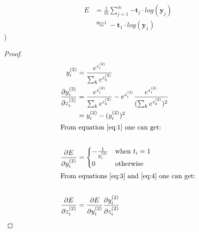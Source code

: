 \documentclass[letterpaper, 11pt]{article}
\begin{document}
\begin{align}
    E & = \frac{1}{m}\sum_{j=1}^{m}{-\textbf{t}_j\cdot log(\textbf{y}_j)} \nonumber \\
      & \stackrel{\text{m=1}}{=} -\textbf{t}_1\cdot log(\textbf{y}_1) \label{eq:1}
\end{align}
)
\begin{proof}
    \begin{align}
        y_i^{(2)}                                     & = \frac{e^{z_i^{(2)}}}{\sum_k{e^{z_k^{(2)}}}}                                                                         \\
        \frac{\partial y_i^{(2)}}{\partial z_i^{(2)}} & = \frac{e^{z_i^{(2)}}}{\sum_k{e^{z_k^{(2)}}}} - e^{z_i^{(2)}}\frac{e^{z_i^{(2)}}}{(\sum_k{e^{z_k^{(2)}}})^2}\nonumber \\
                                                      & = y_i^{(2)} - (y_i^{(2)})^2\label{eq:3}                                                                               \\
        \intertext{From equation \eqref{eq:1} one can get:}\nonumber                                                                                                          \\
        \frac{\partial E}{\partial y_i^{(2)}}         & =
        \begin{cases}
            -\frac{1}{y_i^{(2)}} & \text{when $t_i=1$} \\
            0                    & \text{otherwise}    \\
        \end{cases}\label{eq:4}                                                                                                                            \\
        \intertext{From equations \eqref{eq:3} and \eqref{eq:4} one can get:}\nonumber                                                                                        \\
        \frac{\partial E}{\partial z_i^{(2)}}         & =
        \frac{\partial E}{\partial y_i^{(2)}} \frac{\partial y_i^{(2)}}{\partial z_i^{(2)}} \nonumber                                                                         \\

\end{align}
\end{proof}
\end{document}
